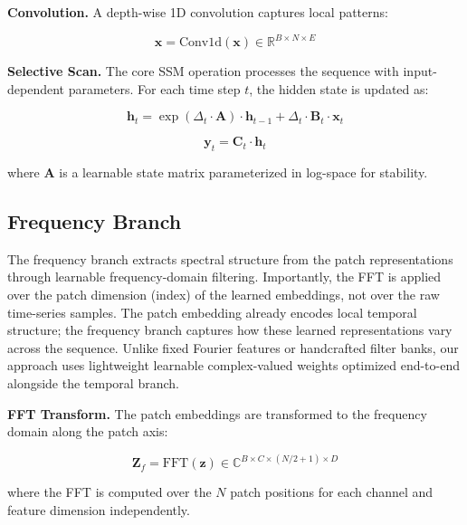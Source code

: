 \documentclass[electronics,article,submit,pdftex,moreauthors]{Definitions/mdpi}
\begin{document}
\textbf{Convolution.} A depth-wise 1D convolution captures local patterns:
\begin{linenomath}
\begin{equation}
\mathbf{x} = \text{Conv1d}(\mathbf{x}) \in \mathbb{R}^{B \times N \times E}
\end{equation}
\end{linenomath}

\textbf{Selective Scan.} The core SSM operation processes the sequence with input-dependent parameters. For each time step $t$, the hidden state is updated as:
\begin{linenomath}
\begin{equation}
\mathbf{h}_t = \exp(\Delta_t \cdot \mathbf{A}) \cdot \mathbf{h}_{t-1} + \Delta_t \cdot \mathbf{B}_t \cdot \mathbf{x}_t
\end{equation}
\end{linenomath}
\begin{linenomath}
\begin{equation}
\mathbf{y}_t = \mathbf{C}_t \cdot \mathbf{h}_t
\end{equation}
\end{linenomath}
where $\mathbf{A}$ is a learnable state matrix parameterized in log-space for stability.

\subsection{Frequency Branch}

The frequency branch extracts spectral structure from the patch representations through learnable frequency-domain filtering. Importantly, the FFT is applied over the patch dimension (index) of the learned embeddings, not over the raw time-series samples. The patch embedding already encodes local temporal structure; the frequency branch captures how these learned representations vary across the sequence. Unlike fixed Fourier features or handcrafted filter banks, our approach uses lightweight learnable complex-valued weights optimized end-to-end alongside the temporal branch.

\textbf{FFT Transform.} The patch embeddings are transformed to the frequency domain along the patch axis:
\begin{linenomath}
\begin{equation}
\mathbf{Z}_f = \text{FFT}(\mathbf{z}) \in \mathbb{C}^{B \times C \times (N/2+1) \times D}
\end{equation}
\end{linenomath}
where the FFT is computed over the $N$ patch positions for each channel and feature dimension independently.
\end{document}
